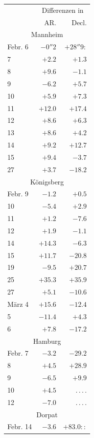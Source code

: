 \begin{center}
\begin{tabular}{l|r|r}
& \multicolumn{2}{c}{Differenzen in} \\
& AR. & Decl. \\
\multicolumn{3}{c}{Mannheim} \\
Febr. 6 & $-0''2$ & $+28''9\!:$ \\
7 & $+2.2$ & $+1.3$ \\
8 & $+9.6$ & $-1.1$ \\
9 & $-6.2$ & $+5.7$ \\
10 & $+5.9$ & $+7.3$ \\
11 & $+12.0$ & $+17.4$ \\
12 & $+8.6$ & $+6.3$ \\
13 & $+8.6$ & $+4.2$ \\
14 & $+9.2$ & $+12.7$ \\
15 & $+9.4$ & $-3.7$ \\
27 & $+3.7$ & $-18.2$ \\
\multicolumn{3}{c}{Königsberg} \\
Febr. 9 & $-1.2$ & $+0.5$ \\
10 & $-5.4$ & $+2.9$ \\
11 & $+1.2$ & $-7.6$ \\
12 & $+1.9$ & $-1.1$ \\
14 & $+14.3$ & $-6.3$ \\
15 & $+11.7$ & $-20.8$ \\
19 & $-9.5$ & $+20.7$ \\
25 & $+35.3$ & $+35.9$ \\
27 & $+5.1$ & $-10.6$ \\
März 4 & $+15.6$ & $-12.4$ \\
5 & $-11.4$ & $+4.3$ \\
6 & $+7.8$ & $-17.2$ \\
\multicolumn{3}{c}{Hamburg} \\
Febr. 7 & $-3.2$ & $-29.2$ \\
8 & $+4.5$ & $+28.9$ \\
9 & $-6.5$ & $+9.9$ \\
10 & $+4.5$ & \mbox{.\,.\,.\,.} \\
12 & $-7.0$ & \mbox{.\,.\,.\,.} \\
\multicolumn{3}{c}{Dorpat} \\
Febr. 14 & $-3.6$ & $+83.0\!::$ \\
\end{tabular}
\end{center}

